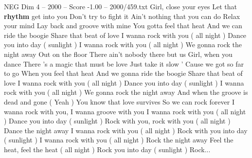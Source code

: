 \begin{textsample}{NEG Dim 4 – 2000 – Score -1.00 – 2000/459.txt}  \label{ex:f4_neg_039}
Girl, close your eyes Let that \textbf{rhythm} get into you Don't try to fight it Ain't nothing that you can do Relax your mind Lay back and groove with mine You gotta feel that heat And we can ride the boogie Share that beat of love I wanna rock with you ( all night ) Dance you into day ( sunlight ) I wanna rock with you ( all night ) We gonna rock the night away Out on the floor There ain't nobody there but us Girl, when you dance There 's a magic that must be love Just take it slow ' Cause we got so far to go When you feel that heat And we gonna ride the boogie Share that beat of love I wanna rock with you ( all night ) Dance you into day ( sunlight ) I wanna rock with you ( all night ) We gonna rock the night away And when the groove is dead and gone ( Yeah ) You know that love survives So we can rock forever I wanna rock with you, I wanna groove with you I wanna rock with you ( all night ) Dance you into day ( sunlight ) Rock with you, rock with you ( all night ) Dance the night away I wanna rock with you ( all night ) Rock with you into day ( sunlight ) I wanna rock with you ( all night ) Rock the night away Feel the heat, feel the heat ( all night ) Rock you into day ( sunlight ) Rock...

\end{textsample}
